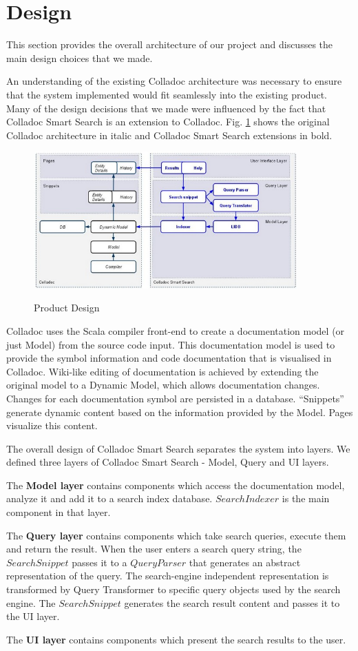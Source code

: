 \section{Design}\label{sec:design}
This section provides the overall architecture of our project and discusses the main design choices that we made.

An understanding of the existing Colladoc architecture was necessary to ensure that the system implemented would fit seamlessly into the existing product. 
Many of the design decisions that we made were influenced by the fact that Colladoc Smart Search is an extension to Colladoc.
Fig. \ref{fig:product-design} shows the original Colladoc architecture in italic and Colladoc Smart Search extensions in bold. 
\begin{figure}[h!t]
\begin{center}
\leavevmode
{\includegraphics[width=0.9\textwidth]{design}}
\end{center}
\caption{Product Design}
\label{fig:product-design}
\end{figure}
Colladoc uses the Scala compiler front-end to create a documentation model (or just Model) from the source code input. This documentation model is used to provide the symbol information and code documentation that is visualised in Colladoc. Wiki-like editing of documentation is achieved by extending the original model to a Dynamic Model, which allows documentation changes. Changes for each documentation symbol are persisted in a database. “Snippets”
generate dynamic content based on the information provided by the Model. Pages visualize this content.

The overall design of Colladoc Smart Search separates the system into layers. We defined three layers of Colladoc Smart Search  - Model, Query and UI layers. 

The \textbf{Model layer} contains components which access the documentation model, analyze it and add it to a search index database. ${SearchIndexer}$ is the main component in that layer.

The \textbf{Query layer} contains components which take search queries,  execute them and return the result. When the user enters a search query string, the $SearchSnippet$ passes it to a $QueryParser$ that generates an abstract representation of the query. The search-engine independent representation is transformed by Query Transformer to specific query objects used by the search engine. The $SearchSnippet$ generates the search result content and passes it to the UI layer.

The \textbf{UI layer} contains components which present the search results to the user.